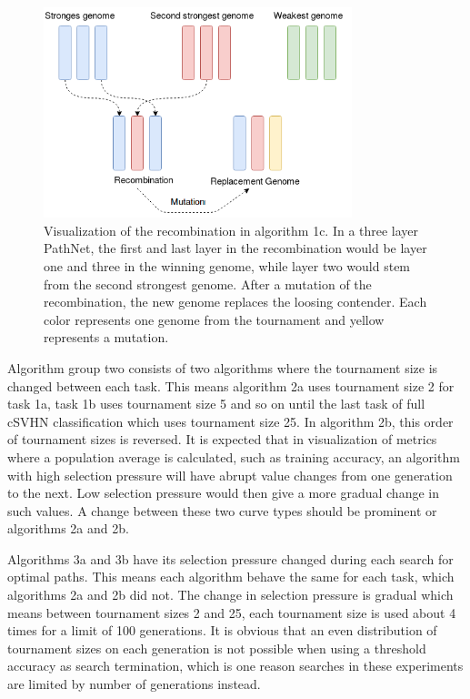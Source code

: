 \begin{figure}[h]
    \centering
    \includegraphics[width=0.8\textwidth]{Chapters/Experiments/search_algo/figures/Recombination_algorithm.png}
    \caption{Visualization of the recombination in algorithm 1c. In a three layer PathNet, the first and last layer in the recombination would be layer one and three in the winning genome, while layer two would stem from the second strongest genome. After a mutation of the recombination, the new genome replaces the loosing contender. Each color represents one genome from the tournament and yellow represents a mutation.}
    \label{fig:search.recombination_algorithm}
\end{figure}

Algorithm group two consists of two algorithms where the tournament size is changed between each task. This means algorithm 2a uses tournament size 2 for task 1a, task 1b uses tournament size 5 and so on until the last task of full cSVHN classification which uses tournament size 25. In algorithm 2b, this order of tournament sizes is reversed. It is expected that in visualization of metrics where a population average is calculated, such as training accuracy, an algorithm with high selection pressure will have abrupt value changes from one generation to the next. Low selection pressure would then give a more gradual change in such values. A change between these two curve types should be prominent or algorithms 2a and 2b.

Algorithms 3a and 3b have its selection pressure changed during each search for optimal paths. This means each algorithm behave the same for each task, which algorithms 2a and 2b did not. The change in selection pressure is gradual which means between tournament sizes 2 and 25, each tournament size is used about 4 times for a limit of 100 generations. It is obvious that an even distribution of tournament sizes on each generation is not possible when using a threshold accuracy as search termination, which is one reason searches in these experiments are limited by number of generations instead. 

